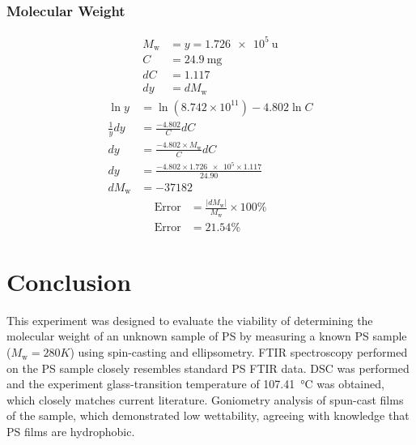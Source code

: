 \documentclass[twocolumn]{article}
\begin{document}
                \subsubsection{Molecular Weight}
                    \begin{align}
                        M_\text{w} &= y = \qty{1.726e5}{\atomicmassunit} \nonumber\\
                        C &= \qty{24.9}{\milli\gram} \nonumber\\
                        dC &= 1.117 \nonumber\\
                        dy &= dM_\text{w} \nonumber
                    \end{align}
                    \begin{align}
                        \ln y &= \ln{(8.742 \times 10^{11})} - 4.802 \ln{C}\\
                        \frac{1}{y}dy &= \frac{-4.802}{C}dC \nonumber\\
                        dy &= \frac{-4.802 \times M_\text{w}}{C}dC \nonumber\\
                        dy &= \frac{-4.802 \times \num{1.726e5} \times 1.117}{24.90} \nonumber\\
                        dM_\text{w} &= - 37182 \nonumber
                    \end{align}
                    \begin{align}
                        \text{Error} &= \frac{|dM_\text{w}|}{M_\text{w}} \times 100\%\\
                        \text{Error} &= 21.54\% \nonumber
                    \end{align}

        \section{Conclusion}
            This experiment was designed to evaluate the viability of determining the molecular weight of an unknown sample of PS by measuring a known PS sample ($M_\text{w} = 280K$) using spin-casting and ellipsometry. FTIR spectroscopy performed on the PS sample closely resembles standard PS FTIR data. DSC was performed and the experiment glass-transition temperature of \qty{107.41}{\degreeCelsius} was obtained, which closely matches current literature. Goniometry analysis of spun-cast films of the sample, which demonstrated low wettability, agreeing with knowledge that PS films are hydrophobic.
\end{document}
